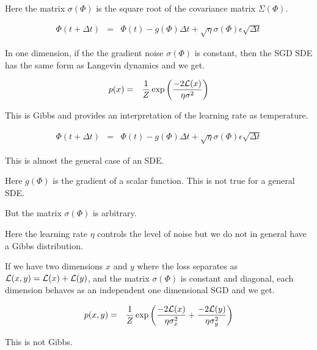{\vfill
Here the matrix $\sigma(\Phi)$ is the square root of the covariance matrix $\Sigma(\Phi)$.


\begin{eqnarray*}
\Phi(t + \Delta t) & = & \Phi(t) -g(\Phi)\Delta t + \sqrt{\eta} \sigma(\Phi) \epsilon\sqrt{\Delta t}
\end{eqnarray*}

\vfill
In one dimension, if the the gradient noise $\sigma(\Phi)$ is constant, then the SGD SDE has the same form as Langevin dynamics and we get.

\begin{eqnarray*}
p(x) & = & \frac{1}{Z} \exp\left(\frac{-2{\cal L}(x)}{ \eta \sigma^2}\right)
\end{eqnarray*}

\vfill
This is Gibbs and provides an interpretation of the learning rate as temperature.



\begin{eqnarray*}
\Phi(t + \Delta t) & = & \Phi(t) -g(\Phi)\Delta t + \sqrt{\eta} \sigma(\Phi) \epsilon\sqrt{\Delta t}
\end{eqnarray*}

\vfill
This is almost the general case of an SDE.

\vfill
Here $g(\Phi)$ is the gradient of a scalar function.  This is not true for a general SDE.

\vfill
But the matrix $\sigma(\Phi)$ is arbitrary.

\vfill
Here the learning rate $\eta$ controls the level of noise but we do not in general have a Gibbs distribution.



If we have two dimensions $x$ and $y$ where the loss separates as ${\cal L}(x,y) = {\cal L}(x) + {\cal L}(y)$, and the matrix $\sigma(\Phi)$ is constant and diagonal,
each dimension behaves as an independent one dimensional SGD and we get.

\begin{eqnarray*}
p(x,y) & = & \frac{1}{Z} \exp\left(\frac{-2{\cal L}(x)}{ \eta \sigma_x^2} + \frac{-2{\cal L}(y)}{\eta \sigma_y^2}\right)
\end{eqnarray*}

\vfill
This is not Gibbs.





}

